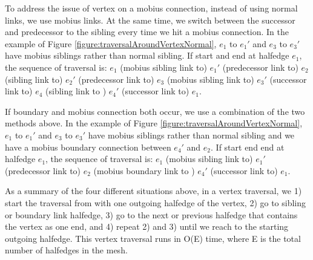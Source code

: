 \documentclass[12pt]{article}
\begin{document}
To address the issue of vertex on a mobius connection, instead of using normal links, we use mobius links. At the same time, we switch between the successor and predecessor to the sibling every time we hit a mobius connection.  In the example of Figure \ref{figure:traversalAroundVertexNormal}, $e_1$ to $e_1'$ and $e_3$ to $e_3'$ have mobius siblings rather than normal sibling. If start and end at halfedge $e_1$, the sequence of traversal is: $e_1$ (mobius sibling link to) $e_1'$ (predecessor link to) $e_2$ (sibling link to) $e_2'$ (predecessor link to) $e_3$ (mobius sibling link to) $e_3'$ (successor link to) $e_4$ (sibling link to ) $e_4'$  (successor link to)  $e_1$.

If boundary and mobius connection both occur, we use a combination of the two methods above. In the example of Figure \ref{figure:traversalAroundVertexNormal}, $e_1$ to $e_1'$ and $e_3$ to $e_3'$ have mobius siblings rather than normal sibling and we have a mobius boundary connection between $e_4'$ and $e_2$. If start end end at halfedge $e_1$, the sequence of traversal is: $e_1$ (mobius sibling link to) $e_1'$ (predecessor link to) $e_2$ (mobius boundary link to ) $e_4'$  (successor link to)  $e_1$.

As a summary of the four different situations above, in a vertex traversal, we 1) start the traversal from with one outgoing halfedge of the vertex, 2) go to sibling or boundary link halfedge, 3) go to the next or previous halfedge that contains the vertex as one end, and 4) repeat 2) and 3) until we reach to the starting outgoing halfedge. This vertex traversal runs in O(E) time, where E is the total number of halfedges in the mesh.
\end{document}
